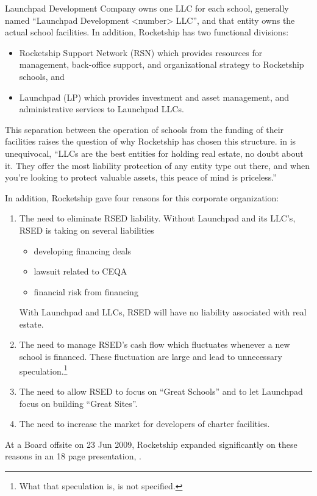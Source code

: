 Launchpad Development Company owns one LLC for each school, generally named ``Launchpad Development <number> LLC'', and that entity owns the actual school facilities. In addition, Rocketship has two functional divisions:
\begin{itemize}
  \item Rocketship Support Network (RSN) which provides resources for management, back-office support, and organizational strategy to Rocketship schools, and
  \item Launchpad (LP) which provides investment and asset management, and administrative services to Launchpad LLCs.
\end{itemize}

This separation between the operation of schools from the funding of their facilities raises the question of why Rocketship has chosen this structure.  in  is unequivocal, ``LLCs are the best entities for holding real estate, no doubt about it. They offer the most liability protection of any entity type out there, and when you're looking to protect valuable assets, this peace of mind is priceless.'' \parencite[292]{Reuting2023}

In addition, Rocketship gave four reasons for this corporate organization:
\begin{enumerate}
  \item The need to eliminate RSED liability. Without Launchpad and its LLC's, RSED is taking on several liabilities
  \begin{itemize}
    \item developing financing deals
    \item lawsuit related to CEQA
    \item financial risk from financing
  \end{itemize}
  With Launchpad and LLCs, RSED will have no liability associated with real estate.
  \item The need to manage RSED's cash flow which fluctuates whenever a new school is financed. These fluctuation are large and lead to unnecessary speculation.\footnote{What that speculation is, is not specified.}
  \item The need to allow RSED to focus on ``Great Schools'' and to let Launchpad focus on building ``Great Sites''.
  \item The need to increase the market for developers of charter facilities.
\end{enumerate}
At a Board offsite on 23 Jun 2009, Rocketship expanded significantly on these reasons in an 18 page presentation, \textcite{RSED2009}.

